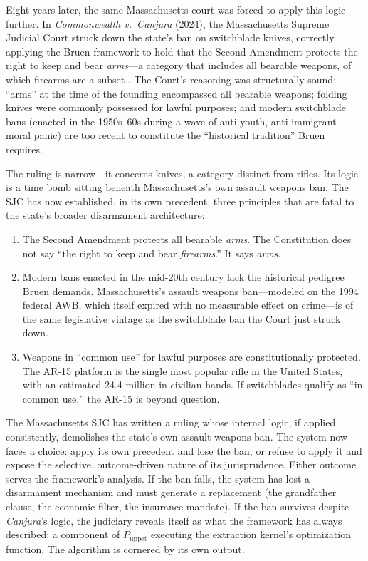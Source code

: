 Eight years later, the same Massachusetts court was forced to apply this logic further. In \textit{Commonwealth v.\ Canjura} (2024), the Massachusetts Supreme Judicial Court struck down the state's ban on switchblade knives, correctly applying the Bruen framework to hold that the Second Amendment protects the right to keep and bear \textit{arms}---a category that includes all bearable weapons, of which firearms are a subset \cite{canjura}. The Court's reasoning was structurally sound: ``arms'' at the time of the founding encompassed all bearable weapons; folding knives were commonly possessed for lawful purposes; and modern switchblade bans (enacted in the 1950s--60s during a wave of anti-youth, anti-immigrant moral panic) are too recent to constitute the ``historical tradition'' Bruen requires.

The ruling is narrow---it concerns knives, a category distinct from rifles. Its logic is a time bomb sitting beneath Massachusetts's own assault weapons ban. The SJC has now established, in its own precedent, three principles that are fatal to the state's broader disarmament architecture:

\begin{enumerate}
    \item The Second Amendment protects all bearable \textit{arms}. The Constitution does not say ``the right to keep and bear \textit{firearms}.'' It says \textit{arms}.
    \item Modern bans enacted in the mid-20th century lack the historical pedigree Bruen demands. Massachusetts's assault weapons ban---modeled on the 1994 federal AWB, which itself expired with no measurable effect on crime---is of the same legislative vintage as the switchblade ban the Court just struck down.
    \item Weapons in ``common use'' for lawful purposes are constitutionally protected. The AR-15 platform is the single most popular rifle in the United States, with an estimated 24.4 million in civilian hands. If switchblades qualify as ``in common use,'' the AR-15 is beyond question.
\end{enumerate}

The Massachusetts SJC has written a ruling whose internal logic, if applied consistently, demolishes the state's own assault weapons ban. The system now faces a choice: apply its own precedent and lose the ban, or refuse to apply it and expose the selective, outcome-driven nature of its jurisprudence. Either outcome serves the framework's analysis. If the ban falls, the system has lost a disarmament mechanism and must generate a replacement (the grandfather clause, the economic filter, the insurance mandate). If the ban survives despite \textit{Canjura}'s logic, the judiciary reveals itself as what the framework has always described: a component of $P_{\text{uppet}}$ executing the extraction kernel's optimization function. The algorithm is cornered by its own output.

